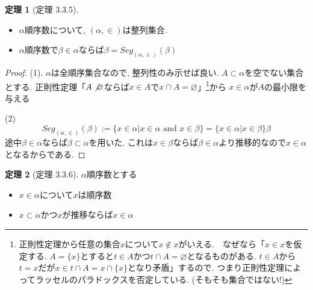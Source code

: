 \documentclass[dvipdfmx,a4paper,11pt]{article}
\theoremstyle{definition}
\newtheorem{thm}{定理}
\begin{document}
 \begin{tcolorbox}
 [colback = white, colframe = green!35!black, fonttitle = \bfseries,breakable = true]
\begin{thm}[定理 3.3.5]
\begin{itemize}
\item $\alpha$順序数について, $(\alpha, \in )$は整列集合.
\item $\alpha$順序数で$\beta \in \alpha$ならば$\beta = Seg_{(\alpha,\in )} (\beta)$
\end{itemize}
\end{thm}
\end{tcolorbox}

\begin{proof}
(1). $\alpha$は全順序集合なので, 整列性のみ示せば良い.
$A \subset \alpha$を空でない集合とする.
正則性定理「$A \not \varnothing$ならば$x \in A $で$x \cap A = \varnothing$」\footnote{正則性定理から任意の集合$x$について$x \not \in x$がいえる.　なぜなら「$x \in x$を仮定する. $A = \{x\}$とすると$t \in A$かつ$t \cap A=\varnothing$となるものがある. $t \in A$から$t=x$だが$x \in t \cap A=x \cap \{ x\} $となり矛盾」するので. つまり正則性定理によってラッセルのパラドックスを否定している. (そもそも集合ではない!)}から
$x \in \alpha$が$A$の最小限を与える

(2)
$$
 Seg_{(\alpha,\in )} (\beta)
 := \{ x \in \alpha | x \in \alpha \text{ and } x \in \beta\}
 =\{ x \in \alpha | x \in \beta\}
 \beta
$$
途中$\beta \in \alpha$ならば$\beta \subset \alpha$を用いた.
これは$x \in \beta$ならば$\beta \in \alpha$より推移的なので$x \in \alpha$となるからである.
\end{proof}

 \begin{tcolorbox}
 [colback = white, colframe = green!35!black, fonttitle = \bfseries,breakable = true]
\begin{thm}[定理 3.3.6]
\label{thm-tanaka-3.3.6}
$\alpha$順序数とする
\begin{itemize}
\item $x \in \alpha $について$x$は順序数
\item $x \subset \alpha$かつ$x$が推移ならば$x \in \alpha$
\end{itemize}
\end{thm}
\end{tcolorbox}
\end{document}
